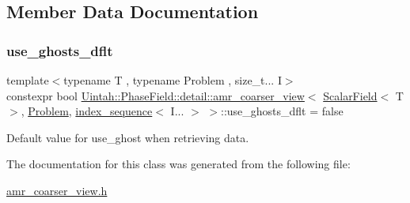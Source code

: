 \subsection{Member Data Documentation}
\mbox{\label{classUintah_1_1PhaseField_1_1detail_1_1amr__coarser__view_3_01ScalarField_3_01T_01_4_00_01Proble9cadea116dab5bdb44bb3e29abbe99ef_ace77967592bbb525ac1e29555bb317cd}} 
\subsubsection{\texorpdfstring{use\+\_\+ghosts\+\_\+dflt}{use\_ghosts\_dflt}}
{\footnotesize\ttfamily template$<$typename T , typename Problem , size\+\_\+t... I$>$ \\
constexpr bool \hyperlink{classUintah_1_1PhaseField_1_1detail_1_1amr__coarser__view}{Uintah\+::\+Phase\+Field\+::detail\+::amr\+\_\+coarser\+\_\+view}$<$ \hyperlink{structUintah_1_1PhaseField_1_1ScalarField}{Scalar\+Field}$<$ T $>$, \hyperlink{classUintah_1_1PhaseField_1_1Problem}{Problem}, \hyperlink{namespaceUintah_1_1PhaseField_a237de804d99512e50613aff7c94a9461}{index\+\_\+sequence}$<$ I... $>$ $>$\+::use\+\_\+ghosts\+\_\+dflt = false\hspace{0.3cm}{\ttfamily [static]}}



Default value for use\+\_\+ghost when retrieving data. 



The documentation for this class was generated from the following file\+:\begin{DoxyCompactItemize}
\item 
\hyperlink{amr__coarser__view_8h}{amr\+\_\+coarser\+\_\+view.\+h}\end{DoxyCompactItemize}
